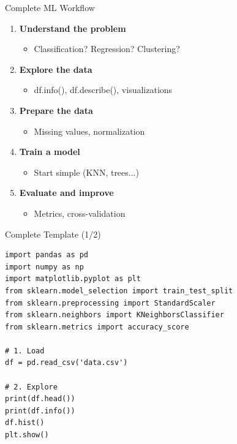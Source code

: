 \documentclass[aspectratio=169]{beamer}
\begin{document}
\begin{frame}{Complete ML Workflow}
\begin{enumerate}
    \item \textbf{Understand the problem}
    \begin{itemize}
        \item Classification? Regression? Clustering?
    \end{itemize}
    
    \item \textbf{Explore the data}
    \begin{itemize}
        \item df.info(), df.describe(), visualizations
    \end{itemize}
    
    \item \textbf{Prepare the data}
    \begin{itemize}
        \item Missing values, normalization
    \end{itemize}
    
    \item \textbf{Train a model}
    \begin{itemize}
        \item Start simple (KNN, trees...)
    \end{itemize}
    
    \item \textbf{Evaluate and improve}
    \begin{itemize}
        \item Metrics, cross-validation
    \end{itemize}
\end{enumerate}
\end{frame}

\begin{frame}[fragile]{Complete Template (1/2)}
\begin{lstlisting}
import pandas as pd
import numpy as np
import matplotlib.pyplot as plt
from sklearn.model_selection import train_test_split
from sklearn.preprocessing import StandardScaler
from sklearn.neighbors import KNeighborsClassifier
from sklearn.metrics import accuracy_score

# 1. Load
df = pd.read_csv('data.csv')

# 2. Explore
print(df.head())
print(df.info())
df.hist()
plt.show()
\end{lstlisting}
\end{frame}
\end{document}
